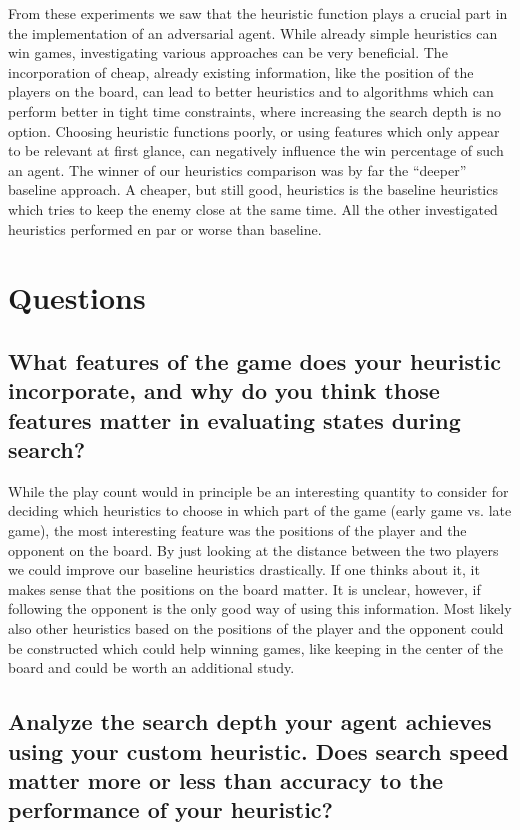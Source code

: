\documentclass[aps,prd,notitlepage,floatfix,superscriptaddress,groupedaddress,nofootinbib]{revtex4-1}
\begin{document}
From these experiments we saw that the heuristic function plays a crucial part in the implementation of an adversarial agent. While already simple heuristics can win games, investigating various approaches can be very beneficial. The incorporation of cheap, already existing information, like the position of the players on the board, can lead to better heuristics and to algorithms which can perform better in tight time constraints, where increasing the search depth is no option. Choosing heuristic functions poorly, or using features which only appear to be relevant at first glance, can negatively influence the win percentage of such an agent. The winner of our heuristics comparison was by far the ``deeper'' baseline approach. A cheaper, but still good, heuristics is the baseline heuristics which tries to keep the enemy close at the same time. All the other investigated heuristics performed en par or worse than baseline.

\section{Questions}

\subsection{What features of the game does your heuristic incorporate, and why do you think those features matter in evaluating states during search?}

While the play count would in principle be an interesting quantity to consider for deciding which heuristics to choose in which part of the game (early game vs. late game), the most interesting feature was the positions of the player and the opponent on the board. By just looking at the distance between the two players we could improve our baseline heuristics drastically. If one thinks about it, it makes sense that the positions on the board matter. It is unclear, however, if following the opponent is the only good way of using this information. Most likely also other heuristics based on the positions of the player and the opponent could be constructed which could help winning games, like keeping in the center of the board and could be worth an additional study.

\subsection{Analyze the search depth your agent achieves using your custom heuristic. Does search speed matter more or less than accuracy to the performance of your heuristic?}
\end{document}
